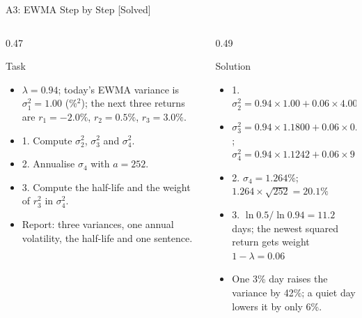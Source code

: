\begin{frame}{A3: EWMA Step by Step [Solved]}
\itemsize{\scriptsize}
\begin{columns}[T]
\begin{column}{0.47\textwidth}
\begin{block}{Task}
\begin{itemize}
    \item $\lambda = 0.94$; today's EWMA variance is $\sigma_1^2 = 1.00$ (\%$^2$); the next three returns are $r_1 = -2.0\%$, $r_2 = 0.5\%$, $r_3 = 3.0\%$.
    \item 1. Compute $\sigma_2^2$, $\sigma_3^2$ and $\sigma_4^2$.
    \item 2. Annualise $\sigma_4$ with $a = 252$.
    \item 3. Compute the half-life and the weight of $r_3^2$ in $\sigma_4^2$.
    \item Report: three variances, one annual volatility, the half-life and one sentence.
\end{itemize}
\end{block}
\end{column}
\begin{column}{0.49\textwidth}
\begin{exampleblock}{Solution}
\begin{itemize}
    \item 1. $\sigma_2^2 = 0.94 \times 1.00 + 0.06 \times 4.00 = 1.1800$
    \item $\sigma_3^2 = 0.94 \times 1.1800 + 0.06 \times 0.25 = 1.1242$; $\sigma_4^2 = 0.94 \times 1.1242 + 0.06 \times 9 = 1.5967$
    \item 2. $\sigma_4 = 1.264\%$; $1.264 \times \sqrt{252} = 20.1\%$
    \item 3. $\ln 0.5/\ln 0.94 = 11.2$ days; the newest squared return gets weight $1 - \lambda = 0.06$
    \item One 3\% day raises the variance by 42\%; a quiet day lowers it by only 6\%.
\end{itemize}
\end{exampleblock}
\end{column}
\end{columns}
\end{frame}

